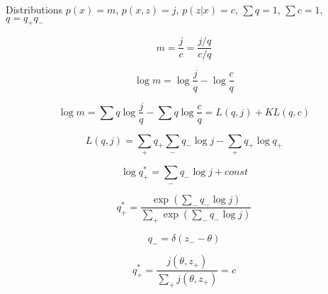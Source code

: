 
Distributions $p(x) = m$, $p(x, z) = j$, $p(z | x) = c$, $\sum q = 1$, $\sum c = 1$, $q = q_+ q_- $

\begin{equation*}
m = \frac{j}{c} = \frac{j/q}{c/q}
\end{equation*}

\begin{equation*}
\log m = \log \frac{j}{q} - \log \frac{c}{q}
\end{equation*}

\begin{equation*}
\log m = \sum q \log \frac{j}{q} - \sum q \log \frac{c}{q} = L(q, j) + KL(q, c)
\end{equation*}

\begin{equation*}
L(q, j) = \sum_+ q_+  \sum_-  q_- \log j -  \sum_+ q_+  \log q_+
\end{equation*}

\begin{equation*}
\log q_+^* = \sum_- q_- \log j   + const
\end{equation*}

\eframe


\begin{equation*}
q_+^* = \frac{ \exp( \sum_- q_- \log j)}{    \sum_+  \exp(\sum_- q_ - \log j) }
\end{equation*}

\begin{equation*}
q_- = \delta(z_- - \theta)
\end{equation*}

\begin{equation*}
q_+^* = \frac{ j(\theta, z_+)}{  \sum_+ j(\theta, z_+) } = c
\end{equation*}

\eframe
